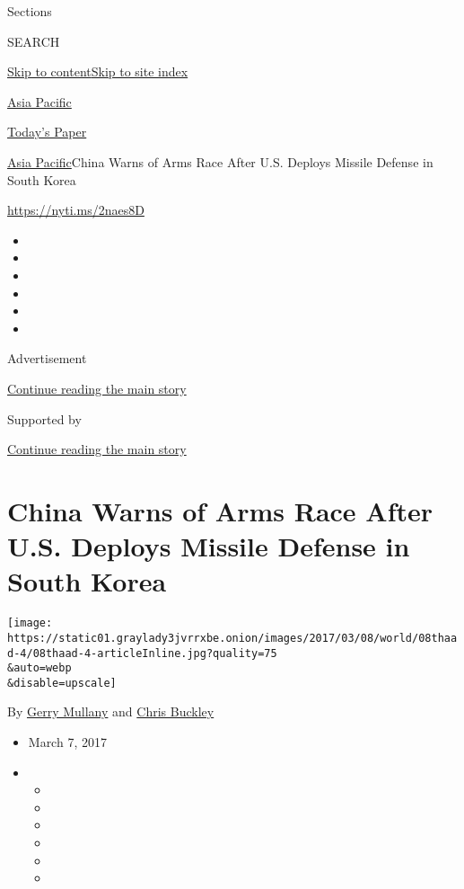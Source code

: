 Sections

SEARCH

\protect\hyperlink{site-content}{Skip to
content}\protect\hyperlink{site-index}{Skip to site index}

\href{https://www.nytimes3xbfgragh.onion/section/world/asia}{Asia
Pacific}

\href{https://myaccount.nytimes3xbfgragh.onion/auth/login?response_type=cookie\&client_id=vi}{}

\href{https://www.nytimes3xbfgragh.onion/section/todayspaper}{Today's
Paper}

\href{/section/world/asia}{Asia Pacific}\textbar{}China Warns of Arms
Race After U.S. Deploys Missile Defense in South Korea

\url{https://nyti.ms/2naes8D}

\begin{itemize}
\item
\item
\item
\item
\item
\item
\end{itemize}

Advertisement

\protect\hyperlink{after-top}{Continue reading the main story}

Supported by

\protect\hyperlink{after-sponsor}{Continue reading the main story}

\hypertarget{china-warns-of-arms-race-after-us-deploys-missile-defense-in-south-korea}{%
\section{China Warns of Arms Race After U.S. Deploys Missile Defense in
South
Korea}\label{china-warns-of-arms-race-after-us-deploys-missile-defense-in-south-korea}}

\texttt{[image: https://static01.graylady3jvrrxbe.onion/images/2017/03/08/world/08thaad-4/08thaad-4-articleInline.jpg?quality=75\\\&auto=webp\\\&disable=upscale]}

By \href{http://www.nytimes3xbfgragh.onion/by/gerry-mullany}{Gerry
Mullany} and
\href{http://www.nytimes3xbfgragh.onion/by/chris-buckley}{Chris Buckley}

\begin{itemize}
\item
  March 7, 2017
\item
  \begin{itemize}
  \item
  \item
  \item
  \item
  \item
  \item
  \end{itemize}
\end{itemize}

